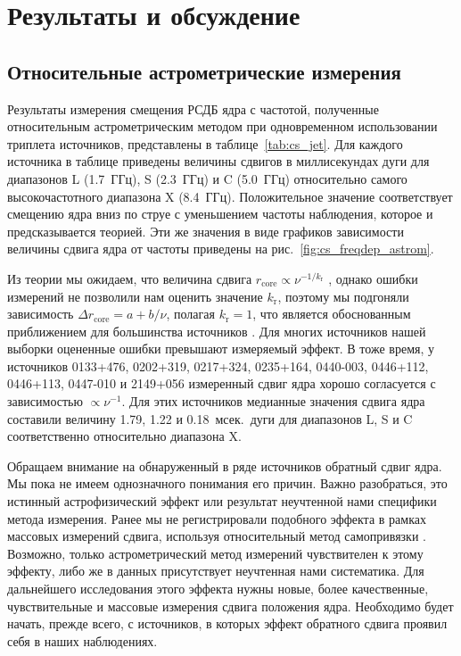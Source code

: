 \section{Результаты и обсуждение}

\subsection{Относительные астрометрические измерения}
Результаты измерения смещения РСДБ ядра с частотой, полученные относительным астрометрическим
методом при одновременном использовании триплета источников, представлены в
таблице~\ref{tab:cs_jet}. Для каждого источника в таблице приведены величины сдвигов в миллисекундах
дуги для диапазонов L (1.7~ГГц), S (2.3~ГГц) и C (5.0~ГГц) относительно самого высокочастотного
диапазона X (8.4~ГГц). Положительное значение соответствует смещению ядра вниз по струе с
уменьшением частоты наблюдения, которое и предсказывается теорией. Эти же значения в виде графиков
зависимости величины сдвига ядра от частоты приведены на рис.~\ref{fig:cs_freqdep_astrom}.

Из теории мы ожидаем, что величина сдвига $r_\text{core} \propto \nu^{-1/k_{\text{r}}}$
\cite{Lobanov_1998}, однако ошибки измерений не позволили нам оценить значение $k_{\text{r}}$,
поэтому мы подгоняли зависимость $\Delta r_\text{core} = a + b/\nu$, полагая $k_\text{r} = 1$,
что является обоснованным приближением для большинства источников \cite{Sokolovsky_2011}.
Для многих источников нашей выборки оцененные ошибки превышают измеряемый эффект. В тоже время, у
источников 0133+476, 0202+319, 0217+324, 0235+164, 0440-003, 0446+112, 0446+113, 0447-010
и 2149+056 измеренный сдвиг ядра хорошо согласуется с зависимостью $\propto \nu^{-1}$. Для этих
источников медианные значения сдвига ядра составили величину 1.79, 1.22 и 0.18~мсек.~дуги для
диапазонов L, S и C соответственно относительно диапазона X.

Обращаем внимание на обнаруженный в ряде источников обратный сдвиг ядра. Мы пока не имеем
однозначного понимания его причин. Важно разобраться, это истинный астрофизический эффект или
результат неучтенной нами специфики метода измерения. Ранее мы не регистрировали подобного эффекта в
рамках массовых измерений сдвига, используя относительный метод самопривязки
\cite{Pushkarev_2012,Plavin2018}. Возможно, только астрометрический метод измерений чувствителен к
этому эффекту, либо же в данных присутствует неучтенная нами систематика. Для дальнейшего
исследования этого эффекта нужны новые, более качественные, чувствительные и массовые измерения
сдвига положения ядра. Необходимо будет начать, прежде всего, с источников, в которых эффект
обратного сдвига проявил себя в наших наблюдениях.

